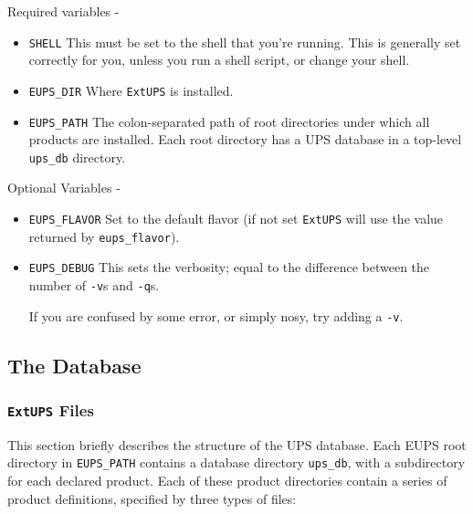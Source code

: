 \documentclass{article}
\newcommand{\code}[1]{\texttt{#1}}
\newcommand{\eups}{\code{ExtUPS}}
\begin{document}
Required variables -

\begin{itemize}
  \item \code{SHELL}
    This must be set to the shell that you're running. This is
    generally set correctly for you, unless you run a shell script, or
    change your shell.

  \item \code{EUPS\_DIR}
    Where \eups{} is installed.

  \item \code{EUPS\_PATH}
    The colon-separated path of root directories under which all products are installed.
    Each root directory has a UPS database in a top-level \code{ups\_db} directory.
\end{itemize}

Optional Variables -

\begin{itemize}
  \item \code{EUPS\_FLAVOR}
    Set to the default flavor (if not set \eups{} will use the value returned
    by \code{eups\_flavor}).

  \item \code{EUPS\_DEBUG}
    This sets the verbosity; equal to the difference between the number of \code{-v}s
    and \code{-q}s.

    If you are confused by some error, or simply nosy, try adding a \code{-v}.
\end{itemize}

\subsection{The Database}

\subsubsection{\eups{} Files}

This section briefly describes the structure of the UPS database. Each
EUPS root directory in \code{EUPS\_PATH} contains a database directory
\code{ups\_db}, with a subdirectory for each declared product.  Each
of these product directories contain a series of product definitions,
specified by three types of files:
\end{document}
